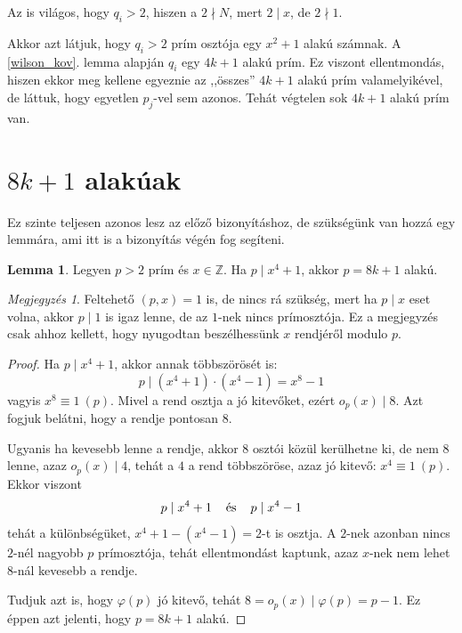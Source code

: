 \documentclass[12pt]{book}
\theoremstyle{plain} %
\theoremstyle{definition} %
\newtheorem{lem/}{Lemma}[section]
\newenvironment{lem}
  {\renewcommand{\qedsymbol}{$\clubsuit$}%
   \pushQED{\qed}\begin{lem/}}
  {\popQED\end{lem/}}
\theoremstyle{remark}
\newtheorem*{mj}{Megjegyzés}
\renewcommand\qedsymbol{$\blacksquare$}
\numberwithin{equation}{section}  %
\def\Z{\mathbb{Z}}
\begin{document}
	Az is világos, hogy $q_i>2$, hiszen a $2\nmid N$, mert $2\mid x$, de $2\nmid 1$.
	
	Akkor azt látjuk, hogy $q_i>2$ prím osztója egy $x^2+1$ alakú számnak. A \ref{wilson_kov}. lemma alapján $q_i$ egy $4k+1$ alakú prím. Ez viszont ellentmondás, hiszen ekkor meg kellene egyeznie az ,,összes'' $4k+1$ alakú prím valamelyikével, de láttuk, hogy egyetlen $p_j$-vel sem azonos. Tehát végtelen sok $4k+1$ alakú prím van.
	
	\section{$8k+1$ alakúak}
	
	Ez szinte teljesen azonos lesz az előző bizonyításhoz, de szükségünk van hozzá egy lemmára, ami itt is a bizonyítás végén fog segíteni.
	
	\begin{lem}\label{8kp1lem}
		Legyen $p>2$ prím és $x\in \Z$. Ha $p\mid x^4+1$, akkor $p=8k+1$ alakú.
	\end{lem}

	\begin{mj}
		Feltehető $(p,x)=1$ is, de nincs rá szükség, mert ha $p\mid x$ eset volna, akkor $p\mid 1$ is igaz lenne, de az $1$-nek nincs prímosztója. Ez a megjegyzés csak ahhoz kellett, hogy nyugodtan beszélhessünk $x$ rendjéről modulo $p$.
	\end{mj}

	\begin{proof}
		Ha $p\mid x^4+1$, akkor annak többszörösét is:
		\[ p\mid (x^4+1)\cdot(x^4-1) = x^8-1  \]
		vagyis $x^8\equiv 1\ (p)$. Mivel a rend osztja a jó kitevőket, ezért $o_p(x)\mid 8$. Azt fogjuk belátni, hogy a rendje pontosan $8$.
		
		Ugyanis ha kevesebb lenne a rendje, akkor $8$ osztói közül kerülhetne ki, de nem $8$ lenne, azaz $o_p(x)\mid 4$, tehát a $4$ a rend többszöröse, azaz jó kitevő: $x^4\equiv 1\ (p)$. Ekkor viszont
		\[ p\mid x^4+1 \hspace{4mm} \text{és} \hspace{4mm} p\mid x^4-1  \]
		tehát a különbségüket, $x^4+1-(x^4-1) = 2$-t is osztja. A $2$-nek azonban nincs $2$-nél nagyobb $p$ prímosztója, tehát ellentmondást kaptunk, azaz $x$-nek nem lehet $8$-nál kevesebb a rendje.
		
		Tudjuk azt is, hogy $\varphi(p)$ jó kitevő, tehát $8=o_p(x)\mid \varphi(p)=p-1$. Ez éppen azt jelenti, hogy $p=8k+1$ alakú.
	\end{proof}
\end{document}
